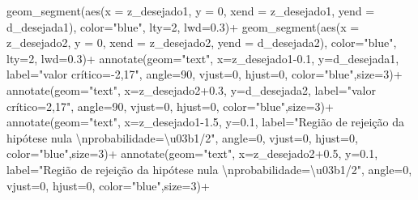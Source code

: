 \documentclass[
]{book}
\newenvironment{Shaded}{\begin{snugshade}}{\end{snugshade}}
\newcommand{\AttributeTok}[1]{\textcolor[rgb]{0.77,0.63,0.00}{#1}}
\newcommand{\DecValTok}[1]{\textcolor[rgb]{0.00,0.00,0.81}{#1}}
\newcommand{\FloatTok}[1]{\textcolor[rgb]{0.00,0.00,0.81}{#1}}
\newcommand{\FunctionTok}[1]{\textcolor[rgb]{0.00,0.00,0.00}{#1}}
\newcommand{\NormalTok}[1]{#1}
\newcommand{\SpecialCharTok}[1]{\textcolor[rgb]{0.00,0.00,0.00}{#1}}
\newcommand{\StringTok}[1]{\textcolor[rgb]{0.31,0.60,0.02}{#1}}
\begin{document}
\begin{Shaded}
\begin{Highlighting}[]
  \FunctionTok{geom\_segment}\NormalTok{(}\FunctionTok{aes}\NormalTok{(}\AttributeTok{x =}\NormalTok{ z\_desejado1, }\AttributeTok{y =} \DecValTok{0}\NormalTok{, }\AttributeTok{xend =}\NormalTok{ z\_desejado1, }\AttributeTok{yend =}\NormalTok{ d\_desejada1), }\AttributeTok{color=}\StringTok{"blue"}\NormalTok{, }\AttributeTok{lty=}\DecValTok{2}\NormalTok{, }\AttributeTok{lwd=}\FloatTok{0.3}\NormalTok{)}\SpecialCharTok{+}
  \FunctionTok{geom\_segment}\NormalTok{(}\FunctionTok{aes}\NormalTok{(}\AttributeTok{x =}\NormalTok{ z\_desejado2, }\AttributeTok{y =} \DecValTok{0}\NormalTok{, }\AttributeTok{xend =}\NormalTok{ z\_desejado2, }\AttributeTok{yend =}\NormalTok{ d\_desejada2), }\AttributeTok{color=}\StringTok{"blue"}\NormalTok{, }\AttributeTok{lty=}\DecValTok{2}\NormalTok{, }\AttributeTok{lwd=}\FloatTok{0.3}\NormalTok{)}\SpecialCharTok{+}
  \FunctionTok{annotate}\NormalTok{(}\AttributeTok{geom=}\StringTok{"text"}\NormalTok{, }\AttributeTok{x=}\NormalTok{z\_desejado1}\FloatTok{{-}0.1}\NormalTok{, }\AttributeTok{y=}\NormalTok{d\_desejada1, }\AttributeTok{label=}\StringTok{"valor crítico={-}2,17"}\NormalTok{, }\AttributeTok{angle=}\DecValTok{90}\NormalTok{, }\AttributeTok{vjust=}\DecValTok{0}\NormalTok{, }\AttributeTok{hjust=}\DecValTok{0}\NormalTok{, }\AttributeTok{color=}\StringTok{"blue"}\NormalTok{,}\AttributeTok{size=}\DecValTok{3}\NormalTok{)}\SpecialCharTok{+}
  \FunctionTok{annotate}\NormalTok{(}\AttributeTok{geom=}\StringTok{"text"}\NormalTok{, }\AttributeTok{x=}\NormalTok{z\_desejado2}\FloatTok{+0.3}\NormalTok{, }\AttributeTok{y=}\NormalTok{d\_desejada2, }\AttributeTok{label=}\StringTok{"valor crítico=2,17"}\NormalTok{, }\AttributeTok{angle=}\DecValTok{90}\NormalTok{, }\AttributeTok{vjust=}\DecValTok{0}\NormalTok{, }\AttributeTok{hjust=}\DecValTok{0}\NormalTok{, }\AttributeTok{color=}\StringTok{"blue"}\NormalTok{,}\AttributeTok{size=}\DecValTok{3}\NormalTok{)}\SpecialCharTok{+}
  \FunctionTok{annotate}\NormalTok{(}\AttributeTok{geom=}\StringTok{"text"}\NormalTok{, }\AttributeTok{x=}\NormalTok{z\_desejado1}\FloatTok{{-}1.5}\NormalTok{, }\AttributeTok{y=}\FloatTok{0.1}\NormalTok{, }\AttributeTok{label=}\StringTok{"Região de rejeição da hipótese nula }\SpecialCharTok{\textbackslash{}n}\StringTok{probabilidade=\textbackslash{}u03b1/2"}\NormalTok{, }\AttributeTok{angle=}\DecValTok{0}\NormalTok{, }\AttributeTok{vjust=}\DecValTok{0}\NormalTok{, }\AttributeTok{hjust=}\DecValTok{0}\NormalTok{, }\AttributeTok{color=}\StringTok{"blue"}\NormalTok{,}\AttributeTok{size=}\DecValTok{3}\NormalTok{)}\SpecialCharTok{+}
  \FunctionTok{annotate}\NormalTok{(}\AttributeTok{geom=}\StringTok{"text"}\NormalTok{, }\AttributeTok{x=}\NormalTok{z\_desejado2}\FloatTok{+0.5}\NormalTok{, }\AttributeTok{y=}\FloatTok{0.1}\NormalTok{, }\AttributeTok{label=}\StringTok{"Região de rejeição da hipótese nula }\SpecialCharTok{\textbackslash{}n}\StringTok{probabilidade=\textbackslash{}u03b1/2"}\NormalTok{, }\AttributeTok{angle=}\DecValTok{0}\NormalTok{, }\AttributeTok{vjust=}\DecValTok{0}\NormalTok{, }\AttributeTok{hjust=}\DecValTok{0}\NormalTok{, }\AttributeTok{color=}\StringTok{"blue"}\NormalTok{,}\AttributeTok{size=}\DecValTok{3}\NormalTok{)}\SpecialCharTok{+}

\end{Highlighting}
\end{Shaded}
\end{document}
